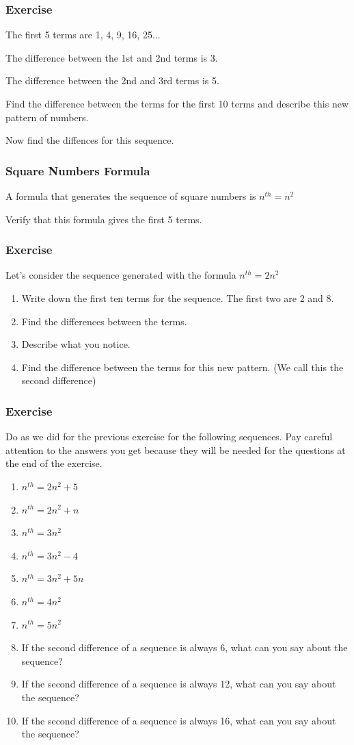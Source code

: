 \subsubsection{Exercise}
The first 5 terms are 1, 4, 9, 16, 25...

The difference between the 1st and 2nd terms is 3.

The difference between the 2nd and 3rd terms is 5.

Find the difference between the terms for the first 10 terms and describe this new pattern of numbers.

Now find the diffences for this sequence.

\subsubsection{Square Numbers Formula}
A formula that generates the sequence of square numbers is $n^{th} = n^2$

Verify that this formula gives the first 5 terms.

\subsubsection{Exercise}
Let's consider the sequence generated with the formula $n^{th}=2n^2$
\begin{enumerate}
  \item Write down the first ten terms for the sequence.  The first two are 2 and 8.
  \item Find the differences between the terms.
  \item Describe what you notice.
  \item Find the difference between the terms for this new pattern. (We call this the second difference)
\end{enumerate}

\subsubsection{Exercise}
Do as we did for the previous exercise for the following sequences.  Pay careful attention to the answers you get because they will be needed for the questions at the end of the exercise.
\begin{enumerate}
  \item $n^{th}=2n^2 + 5$
  \item $n^{th}=2n^2 + n$
  \item $n^{th}=3n^2$
  \item $n^{th}=3n^2-4$
  \item $n^{th}=3n^2+5n$
  \item $n^{th}=4n^2$
  \item $n^{th}=5n^2$
  \item If the second difference of a sequence is always 6, what can you say about the sequence?
  \item If the second difference of a sequence is always 12, what can you say about the sequence?
  \item If the second difference of a sequence is always 16, what can you say about the sequence?
\end{enumerate}


